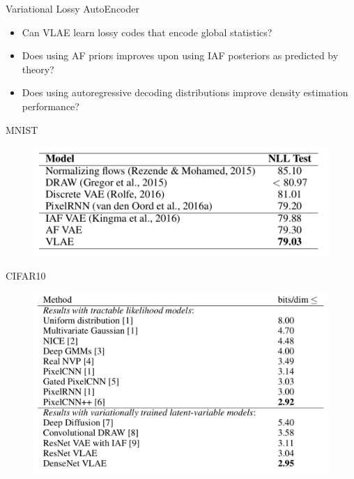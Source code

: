 \documentclass{beamer}
\begin{document}
\begin{frame}{Variational Lossy AutoEncoder}
	\begin{itemize}
		\item Can VLAE learn lossy codes that encode global statistics?
		\item Does using AF priors improves upon using IAF posteriors as predicted by theory?
		\item Does using autoregressive decoding distributions improve density estimation performance?
	\end{itemize}
	\begin{minipage}[t]{0.5\columnwidth}
		\vspace{1cm}
		MNIST
		\begin{figure}[h]
			\centering
			\includegraphics[width=1.\linewidth]{figs/VLAE_1.png}
		\end{figure}
	\end{minipage}%
	\begin{minipage}[t]{0.5\columnwidth}
		CIFAR10
		\begin{figure}[h]
			\centering
			\includegraphics[width=1.\linewidth]{figs/VLAE_2.png}
		\end{figure}
	\end{minipage}
	
\end{frame}
\end{document}
